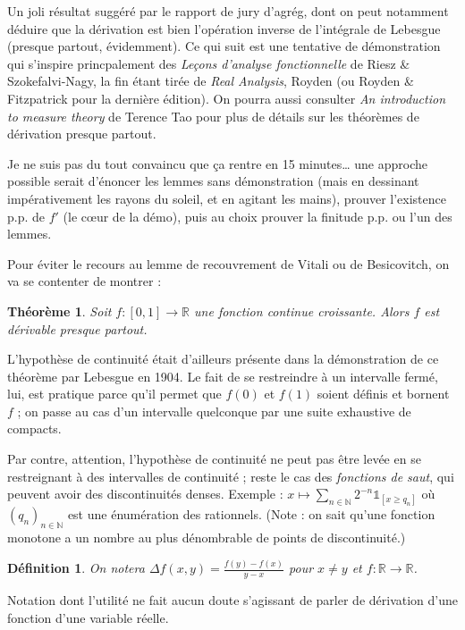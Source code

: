 \documentclass[a4paper, 11pt]{article}
\def\N{\mathbb{N}}
\def\R{\mathbb{R}}
\def\Indic{\mathbb{1}}
\newtheorem*{definition}{Définition}
\newtheorem*{theorem}{Théorème}
\begin{document}
Un joli résultat suggéré par le rapport de jury d'agrég, dont on peut notamment
déduire que la dérivation est bien l'opération inverse de l'intégrale de
Lebesgue (presque partout, évidemment). Ce qui suit est une tentative de
démonstration qui s'inspire princpalement des \emph{Leçons d'analyse
  fonctionnelle} de Riesz \& Szokefalvi-Nagy, la fin étant tirée de \emph{Real
  Analysis}, Royden (ou Royden \& Fitzpatrick pour la dernière édition). On
pourra aussi consulter \emph{An introduction to measure theory} de Terence Tao
pour plus de détails sur les théorèmes de dérivation presque partout.

Je ne suis pas du tout convaincu que ça rentre en 15 minutes… une approche
possible serait d'énoncer les lemmes sans démonstration (mais en dessinant
impérativement les rayons du soleil, et en agitant les mains), prouver
l'existence p.p. de $f'$ (le cœur de la démo), puis au choix prouver la finitude
p.p. ou l'un des lemmes.

Pour éviter le recours au lemme de recouvrement de Vitali ou de Besicovitch, on
va se contenter de montrer :
\begin{theorem}
  Soit $f : [0,1] \to \R$ une fonction \textnormal{continue} croissante. Alors $f$ est
  dérivable presque partout.
\end{theorem}
L'hypothèse de continuité était d'ailleurs présente dans la démonstration de ce
théorème par Lebesgue en 1904. Le fait de se restreindre à un intervalle fermé,
lui, est pratique parce qu'il permet que $f(0)$ et $f(1)$ soient définis et
bornent $f$ ; on passe au cas d'un intervalle quelconque par une suite
exhaustive de compacts.

Par contre, attention, l'hypothèse de continuité ne peut pas être levée en se
restreignant à des intervalles de continuité ; reste le cas des \emph{fonctions
  de saut}, qui peuvent avoir des discontinuités denses. Exemple : $x \mapsto
\sum_{n \in \N} 2^{-n} \Indic_{[x \geq q_n]}$ où $(q_n)_{n \in \N}$ est une
énumération des rationnels. (Note : on sait qu'une fonction monotone a un nombre
au plus dénombrable de points de discontinuité.)

\begin{definition}
  On notera $\displaystyle \Delta f(x,y) = \frac{f(y) - f(x)}{y - x}$ pour $x
  \neq y$ et $f : \R \to \R$.
\end{definition}
Notation dont l'utilité ne fait aucun doute s'agissant de parler de dérivation
d'une fonction d'une variable réelle.
\end{document}
